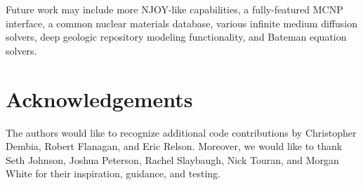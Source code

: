 \documentclass{anstrans}
\begin{document}
Future work may include more NJOY-like capabilities, a fully-featured MCNP
interface, a common nuclear materials database, various infinite medium
diffusion solvers, deep geologic repository modeling functionality, and Bateman
equation solvers.

\section*{Acknowledgements}
The authors would like to recognize additional code contributions by Christopher
Dembia, Robert Flanagan, and Eric Relson.  Moreover, we would like to thank Seth
Johnson, Joshua Peterson, Rachel Slaybaugh, Nick Touran, and Morgan White for
their inspiration, guidance, and testing.


\nocite{*}


\end{document}
